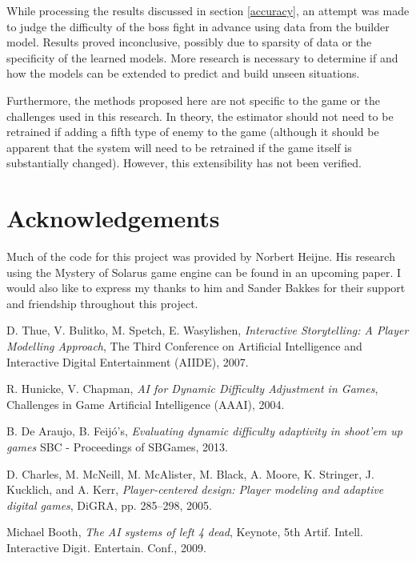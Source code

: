 \documentclass[a4paper]{article}
\begin{document}
\begin{multicols*}{2}
While processing the results discussed in section \ref{accuracy}, an attempt was made to judge the difficulty of the boss fight in advance using data from the builder model. Results proved inconclusive, possibly due to sparsity of data or the specificity of the learned models. More research is necessary to determine if and how the models can be extended to predict and build unseen situations.

Furthermore, the methods proposed here are not specific to the game or the challenges used in this research. In theory, the estimator should not need to be retrained if adding a fifth type of enemy to the game (although it should be apparent that the system will need to be retrained if the game itself is substantially changed). However, this extensibility has not been verified.

\section{Acknowledgements}
Much of the code for this project was provided by Norbert Heijne. His research using the Mystery of Solarus game engine can be found in an upcoming paper. I would also like to express my thanks to him and Sander Bakkes for their support and friendship throughout this project.


\begin{thebibliography}{9}

D. Thue, V. Bulitko, M. Spetch, E. Wasylishen,
\emph{Interactive Storytelling: A Player Modelling Approach},
The Third Conference on
Artificial Intelligence and Interactive Digital Entertainment (AIIDE),
2007.

R. Hunicke, V. Chapman, 
\emph{AI for Dynamic Difficulty Adjustment in Games},
Challenges in Game Artificial Intelligence (AAAI),
2004.

B. De Araujo, B. Feij\'o's,
\emph{Evaluating dynamic difficulty adaptivity in shoot’em up games}
SBC - Proceedings of SBGames,
2013.

D. Charles, M. McNeill, M. McAlister, M. Black, A. Moore, K. Stringer, J. Kucklich, and A. Kerr, 
\emph{Player-centered design: Player modeling and
adaptive digital games},
DiGRA, pp. 285–298,
2005.

Michael Booth,
\emph{The AI systems of left 4 dead},
Keynote, 5th Artif. Intell. Interactive Digit. Entertain. Conf.,
2009.


\end{thebibliography}
\end{multicols*}
\end{document}
